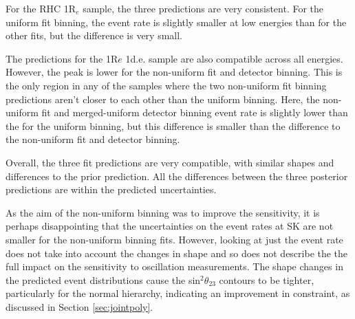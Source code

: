 For the RHC 1R$_e$ sample, the three predictions are very consistent. For the uniform fit binning, the event rate is slightly smaller at low energies than for the other fits, but the difference is very small.

The predictions for the 1R$e$ 1d.e. sample are also compatible across all energies. However, the peak is lower for the non-uniform fit and detector binning. This is the only region in any of the samples where the two non-uniform fit binning predictions aren't closer to each other than the uniform binning. Here, the non-uniform fit and merged-uniform detector binning event rate is slightly lower than the for the uniform binning, but this difference is smaller than the difference to the non-uniform fit and detector binning. 

Overall, the three fit predictions are very compatible, with similar shapes and differences to the prior prediction. All the differences between the three posterior predictions are within the predicted uncertainties.

As the aim of the non-uniform binning was to improve the sensitivity, it is perhaps disappointing that the uncertainties on the event rates at SK are not smaller for the non-uniform binning fits. However, looking at just the event rate does not take into account the changes in shape and so does not describe the the full impact on the sensitivity to oscillation measurements. The shape changes in the predicted event distributions cause the sin$^2\theta_{23}$ contours to be tighter, particularly for the normal hierarchy, indicating an improvement in constraint, as discussed in Section \ref{sec:jointpoly}. 

